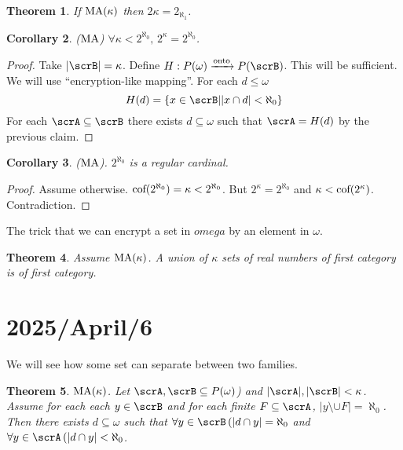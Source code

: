 \documentclass[11pt,pdftex,twoside,a4paper]{article}
\newcommand{\MA}{\ensuremath{\mathop{\rm MA}\nolimits}}
\newtheorem{thm}{Theorem}[section]
\newtheorem{corollary}[thm]{Corollary}
\begin{document}
\begin{thm}
If \(\MA(\kappa)\) then \(2\kappa = 2_{\aleph_1}\).
\end{thm}
\begin{corollary}
(\(\MA\)) \(\forall \kappa < 2^{\aleph_0},\,2^\kappa = 2^{\aleph_0}\).
\end{corollary}
\begin{proof}
Take \(|\scrB|=\kappa\).
Define \(H: P(\omega) \xrightarrow{\text{onto}} P(\scrB)\).
This will be sufficient. We will use ``encryption-like mapping''.
For each \(d\leq\omega\)
\begin{equation*}
H(d) = \{x\in\scrB| |x\cap d| < \aleph_0\}
\end{equation*}
For each \(\scrA\subseteq\scrB\) there exists \(d\subseteq\omega\)
such that \(\scrA = H(d)\) by the previous claim.
\end{proof}
\begin{corollary}
 (\MA). \(2^{\aleph_0}\) is a regular cardinal.
\end{corollary}
\begin{proof}
Assume otherwise. \(\textnormal{cof}(2^{\aleph_0})=\kappa < 2^{\aleph_0}\).
But \(2^\kappa = 2^{\aleph_0}\) and \(\kappa < \textnormal{cof}(2^\kappa)\).
Contradiction.
\end{proof}

The trick that we can encrypt a set in \(omega\) by an element in \(\omega\).

\begin{thm}
Assume \(\MA(\kappa)\).
A union of \(\kappa\) sets of real numbers of first category
is of first category.
\end{thm}


\section{2025/April/6}


We will see how some set can separate between two families.

\begin{thm} \label{thm:MAk:AB:sepd}
\(\MA(\kappa)\).
Let \(\scrA,\scrB \subseteq P(\omega)\)) and \(|\scrA|,|\scrB| < \kappa\).
Assume for each each \(y\in\scrB\) and for each finite \(F\subseteq \scrA\),
\(|y \setminus \cup F|=\aleph_0\).
Then there exists \(d\subseteq \omega\) such that 
\(\forall y\in\scrB\,(|d\cap y|=\aleph_0\) and
\(\forall y\in\scrA\,(|d\cap y|<\aleph_0\).
\end{thm}
\end{document}
